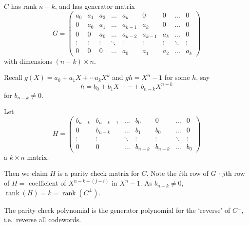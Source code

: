 \documentclass{article}
\newcommand{\1}[1]{\mathbbm{1}_{#1}}
\DeclareMathOperator{\rank}{rank}
\begin{document}
\begin{cor}
    $C$ has rank $n-k$, and has generator matrix
    \begin{equation*}
        G =
        \begin{pmatrix}
            a_0 & a_1 & a_2 & \dots & a_k & 0 & 0 & \dots & 0 \\
            0 & a_0 & a_1 & \dots & a_{k-1} & a_k & 0 & \dots & 0 \\
            0 & 0 & a_0 & \dots & a_{k-2} & a_{k-1} & a_k & \dots & 0 \\
            \vdots & \vdots & \vdots & \ddots & \vdots & \vdots & \vdots & \ddots & \vdots \\
            0 & 0 & 0 & \dots & a_0 & a_1 & a_2 & \dots & a_k
        \end{pmatrix}
    \end{equation*}
    with dimensions $(n-k) \times n$.
\end{cor}
Recall $g(X) = a_0 + a_1 X + \dotsb a_k X^k$ and $gh = X^n - 1$ for some $h$, say
\begin{equation*}
    h = b_0 + b_1 X + \dotsb + b_{n-k} X^{n-k}
\end{equation*}
for $b_{n-k} \neq 0$.

Let
\begin{equation*}
    H =
    \begin{pmatrix}
        b_{n-k} & b_{n-k-1} & \dots & b_0 & 0 & \dots & 0 \\
        0 & b_{n-k} & \dots & b_1 & b_0 & \dots & 0 \\
        \vdots & \vdots & \ddots & \vdots & \vdots & \ddots & \vdots \\
        0 & 0 & \dots & b_{n-k} & b_{n-k} & \dots & b_0
    \end{pmatrix}
\end{equation*}
a $k \times n$ matrix.

Then we claim $H$ is a parity check matrix for $C$.
Note the $i$th row of $G$ $\cdot$ $j$th row of $H = $ coefficient of $X^{n - k + (j-i)}$ in $X^n - 1$.
As $b_{n-k} \neq 0$, $\rank(H) = k = \rank(C^\perp)$.

\begin{nlemma}\label{lem:2.32}
    The parity check polynomial is the generator polynomial for the `reverse' of $C^\perp$, i.e.\ reverse all codewords.
\end{nlemma}
\end{document}
